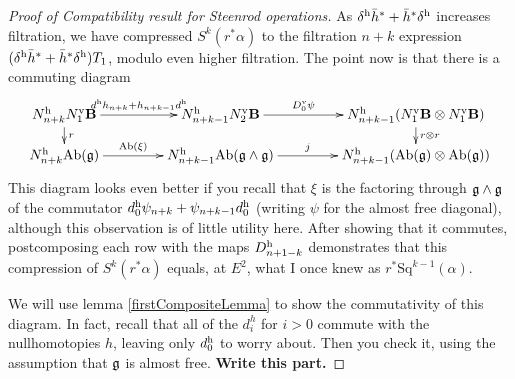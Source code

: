 \documentclass[10pt]{article}
\newcommand{\Sq}{\mathrm{Sq}}
\begin{document}
\begin{Lie Steenrods satisfy the Adem relation}
\begin{proof}[Proof of Compatibility result for Steenrod operations]
As $\delta^\textup{h}\bar{h}^*+ \bar{h}^*\delta^\textup{h}$ increases filtration, we have compressed $S^k(r^*\alpha)$ to the filtration $n+k$ expression $(\delta^\textup{h}\bar{h}^*+ \bar{h}^*\delta^\textup{h})T_1$, modulo even higher filtration.
The point now is that there is a commuting diagram
\[\xymatrix@R=4mm@C=15mm{
N_{n+k}^\textup{h}N_1^\textup{v}\textbf{B} \ar[r]^-{d^\textup{h}h_{n+k}+h_{n+k-1}d^\textup{h}}
\ar[d]^-{r}&%
N_{n+k-1}^\textup{h}N_2^\textup{v}\textbf{B} \ar[r]^-{D^\textup{v}_0\circ\psi}&%
N_{n+k-1}^\textup{h}(N_1^\textup{v}\textbf{B}\otimes N_1^\textup{v}\textbf{B})\ar[d]^-{r\otimes r}
\\%
N_{n+k}^\textup{h}\textup{Ab}(\frakg) \ar[r]^-{\textup{Ab}(\xi)}&%
N_{n+k-1}^\textup{h}\textup{Ab}(\frakg\wedge \frakg) \ar[r]^-{j}&%
N_{n+k-1}^\textup{h}(\textup{Ab}(\frakg)\otimes \textup{Ab}(\frakg))
}\]
This diagram looks even better if you recall that $\xi$ is the factoring through $\mathfrak{g}\wedge\mathfrak{g}$ of the commutator ${d_0^\textup{h}\psi_{n+k}+\psi_{n+k-1} d_0^\textup{h}}$ (writing $\psi$ for the almost free diagonal), although this observation is of little utility here. After showing that it commutes, postcomposing each row with the maps $D^\textup{h}_{n+1-k}$ demonstrates that this compression of $S^k(r^*\alpha)$ equals, at $E^2$, what I once knew as $r^*\Sq^{k-1}(\alpha)$.

We will use lemma \ref{firstCompositeLemma} to show the commutativity of this diagram. In fact, recall that all of the $d^h_i$ for $i>0$ commute with the nullhomotopies $h$, leaving only $d^\textup{h}_0$ to worry about. Then you check it, using the assumption that $\mathfrak{g}$ is almost free. \textbf{Write this part.}
\end{proof}















\end{Lie Steenrods satisfy the Adem relation}
\end{document}
